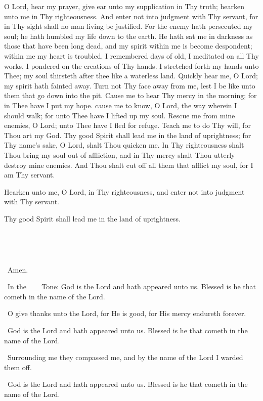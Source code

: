 \documentclass[
  14pt,
  letterpaper,
  openright,
  twocolumn,
  twoside]{memoir}
\begin{document}
O Lord, hear my prayer, give ear unto my supplication in Thy truth; hearken unto me in Thy righteousness. And enter not into judgment with Thy servant, for in Thy sight shall no man living be justified. For the enemy hath persecuted my soul; he hath humbled my life down to the earth. He hath sat me in darkness as those that have been long dead, and my spirit within me is become despondent; within me my heart is troubled. I remembered days of old, I meditated on all Thy works, I pondered on the creations of Thy hands. I stretched forth my hands unto Thee; my soul thirsteth after thee like a waterless land. Quickly hear me, O Lord; my spirit hath fainted away. Turn not Thy face away from me, lest I be like unto them that go down into the pit. Cause me to hear Thy mercy in the morning; for in Thee have I put my hope. cause me to know, O Lord, the way wherein I should walk; for unto Thee have I lifted up my soul. Rescue me from mine enemies, O Lord; unto Thee have I fled for refuge. Teach me to do Thy will, for Thou art my God. Thy good Spirit shall lead me in the land of uprightness; for Thy name's sake, O Lord, shalt Thou quicken me. In Thy righteousness shalt Thou bring my soul out of affliction, and in Thy mercy shalt Thou utterly destroy mine enemies. And Thou shalt cut off all them that afflict my soul, for I am Thy servant.

Hearken unto me, O Lord, in Thy righteousness, and enter not into judgment with Thy servant. \twice\

Thy good Spirit shall lead me in the land of uprightness.

\glory\ \bothnow\

\alleluia\ \twice\

\alleluiaFinal


\choir\ Amen.

\deaconPriest\ In the \_\_ Tone: God is the Lord and hath appeared unto us. Blessed is he that cometh in the name of the Lord.

\stikh\ O give thanks unto the Lord, for He is good, for His mercy endureth forever.

\choir\ God is the Lord and hath appeared unto us. Blessed is he that cometh in the name of the Lord.

\stikh\ Surrounding me they compassed me, and by the name of the Lord I warded them off.

\choir\ God is the Lord and hath appeared unto us. Blessed is he that cometh in the name of the Lord.
\end{document}
